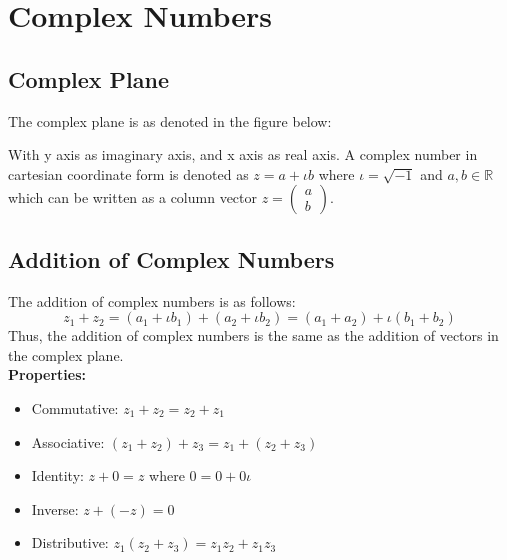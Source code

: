 \documentclass[12pt, oneside]{book}
\theoremstyle{definition}
\theoremstyle{definition}
\theoremstyle{remark}
\begin{document}
\section{Complex Numbers}
\subsection{Complex Plane}
The complex plane is as denoted in the figure below:
\begin{center}
\end{center}
With y axis as imaginary axis, and x axis as real axis. A complex number in cartesian coordinate form is denoted as 
$z=a+\iota b$ where $\iota =\sqrt{-1}$ and $a,b \in \mathbb{R}$ which can be written as a column vector $z=\begin{pmatrix} a \\ b \end{pmatrix}$.

\subsection{Addition of Complex Numbers}
The addition of complex numbers is as follows:
\[ z_1+z_2=(a_1+\iota b_1)+(a_2+\iota b_2)=(a_1+a_2)+\iota(b_1+b_2) \]
Thus, the addition of complex numbers is the same as the addition of vectors in the complex plane.\\
\textbf{Properties: }
\begin{itemize}
    \item Commutative: $z_1+z_2=z_2+z_1$
    \item Associative: $(z_1+z_2)+z_3=z_1+(z_2+z_3)$
    \item Identity: $z+0=z$ where $0=0+0\iota$
    \item Inverse: $z+(-z)=0$
    \item Distributive: $z_1(z_2+z_3)=z_1z_2+z_1z_3$
\end{itemize}
\end{document}
